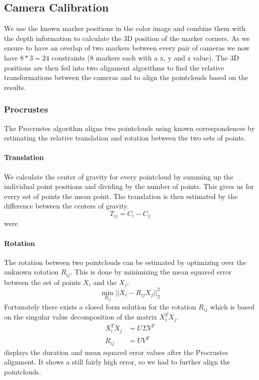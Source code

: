 \documentclass[10pt,twocolumn,letterpaper]{article}
\begin{document}
\subsection{Camera Calibration}
We use the known marker positions in the color image and combine them with the depth information to calculate the 3D position of the marker corners. As we ensure to have an overlap of two markers between every pair of cameras we now have $8*3=24$ constraints (8 markers each with a x, y and z value). The 3D positions are then fed into two alignment algorithms to find the relative transformations between the cameras and to align the pointclouds based on the results.
%
\subsubsection{Procrustes}
The Procrustes algorithm aligns two pointclouds using known correspondences by estimating the relative translation and rotation between the two sets of points.
\paragraph{Translation}
We calculate the center of gravity for every pointcloud by summing up the individual point positions and dividing by the number of points. This gives us for every set of points the mean point. The translation is then estimated by the difference between the centers of gravity.
\begin{equation}
	T_{ij} = C_i - C_j
\end{equation}were
\paragraph{Rotation}
The rotation between two pointclouds can be estimated by optimizing over the unknown rotation $R_{ij}$. This is done by minimizing the mean squared error between the set of points $X_i$ and the $X_j$.
\begin{equation}
	\min_{R_{ij}} || X_i - R_{ij} X_j ||^2_2
\end{equation}
Fortunately there exists a closed form solution for the rotation $R_{ij}$ which is based on the singular value decomposition of the matrix $X_i^T X_j$.
\begin{align}
	X_i^T X_j &= U \Sigma V^T \\
	R_{ij} &= UV^T
\end{align}
 displays the duration and mean squared error values after the Procrustes alignment. It shows a still fairly high error, so we had to further align the pointclouds.
%
\end{document}
